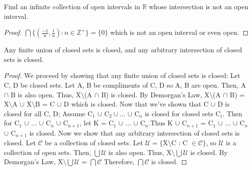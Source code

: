 \documentclass{article}
\begin{document}
	\begin{proposition}
	Find an infinite collection of open intervals in $\mathbb{R}$ whose intersection is not an open interval.
	\end{proposition}
	\begin{proof}
	$\bigcap\lbrace (\frac{-1}{n}, \frac{1}{n}) : n \in \mathbb{Z}^+\rbrace = \lbrace 0 \rbrace$ which is not an open interval or even open.
	\end{proof}

  \begin{proposition}
      Any finite union of closed sets is closed, and any arbitrary intersection of closed sets is closed.
  \end{proposition}
  \begin{proof}
	We proceed by showing that any finite union of closed sets is closed:
  	\newline
  	Let C, D be closed sets.
  	\newline
  	Let A, B be compliments of C, D so A, B are open.
  	\newline
  	Then, A $\cap$ B is also open.
  	\newline
  	Thus, X$\setminus$(A $\cap$ B) is closed.
  	\newline
  	By Demorgan's Law, X$\setminus$(A $\cap$ B) = X$\setminus$A $\cup$ X$\setminus$B = C $\cup$ D which is closed.
  	\newline\newline
	Now that we've shown that C $\cup$ D is closed for all C, D; Assume C$_1$ $\cup $ C$_2 \cup ...$ $\cup $ C$_n$ is closed for closed sets C$_i$. Then for C$_1$ $\cup$ ... $\cup$ C$_n$ $\cup$ C$_{n+1}$, let K = C$_1$ $\cup$ ... $\cup$ C$_n$.\newline Thus K $\cup$ C$_{n+1}$ = C$_1$ $\cup$ ... $\cup$ C$_n$ $\cup$ C$_{n+1}$ is closed.
	\newline
	Now we show that any arbitrary intersection of closed sets is closed.
  	\newline
  	Let $\mathcal{C}$ be a collection of closed sets.
  	\newline
  	Let $\mathcal{U} = \lbrace$X$\setminus$C : C $\in \mathcal{C}\rbrace$, so $\mathcal{U}$ is a collection of open sets.
  	\newline
  	Then, $\bigcup \mathcal{U}$ is also open.
  	\newline
  	Thus, X$\setminus\bigcup\mathcal{U}$ is closed.
  	\newline
  	By Demorgan's Law, X$\setminus\bigcup\mathcal{U}$ = $\bigcap\mathcal{C}$
  	\newline
  	Therefore, $\bigcap\mathcal{C}$ is closed.
	\end{proof}
\end{document}
